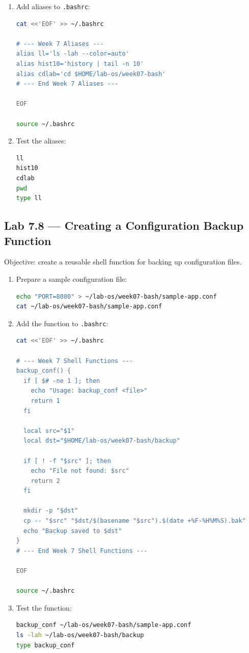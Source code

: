 \begin{enumerate}
  \item Add aliases to \texttt{.bashrc}:
\begin{lstlisting}[language=bash, caption={Adding aliases to .bashrc}]
cat <<'EOF' >> ~/.bashrc

# --- Week 7 Aliases ---
alias ll='ls -lah --color=auto'
alias hist10='history | tail -n 10'
alias cdlab='cd $HOME/lab-os/week07-bash'
# --- End Week 7 Aliases ---

EOF

source ~/.bashrc
\end{lstlisting}

  \item Test the aliases:
\begin{lstlisting}[language=bash, caption={Testing the aliases}]
ll
hist10
cdlab
pwd
type ll
\end{lstlisting}
\end{enumerate}

\subsection*{Lab 7.8 --- Creating a Configuration Backup Function}

Objective: create a reusable shell function for backing up configuration
files.

\begin{enumerate}
  \item Prepare a sample configuration file:
\begin{lstlisting}[language=bash, caption={Creating a sample configuration file}]
echo "PORT=8080" > ~/lab-os/week07-bash/sample-app.conf
cat ~/lab-os/week07-bash/sample-app.conf
\end{lstlisting}

  \item Add the function to \texttt{.bashrc}:
\begin{lstlisting}[language=bash, caption={Adding the backup\_conf function to .bashrc}]
cat <<'EOF' >> ~/.bashrc

# --- Week 7 Shell Functions ---
backup_conf() {
  if [ $# -ne 1 ]; then
    echo "Usage: backup_conf <file>"
    return 1
  fi

  local src="$1"
  local dst="$HOME/lab-os/week07-bash/backup"

  if [ ! -f "$src" ]; then
    echo "File not found: $src"
    return 2
  fi

  mkdir -p "$dst"
  cp -- "$src" "$dst/$(basename "$src").$(date +%F-%H%M%S).bak"
  echo "Backup saved to $dst"
}
# --- End Week 7 Shell Functions ---

EOF

source ~/.bashrc
\end{lstlisting}

  \item Test the function:
\begin{lstlisting}[language=bash, caption={Testing the backup\_conf function}]
backup_conf ~/lab-os/week07-bash/sample-app.conf
ls -lah ~/lab-os/week07-bash/backup
type backup_conf
\end{lstlisting}
\end{enumerate}

